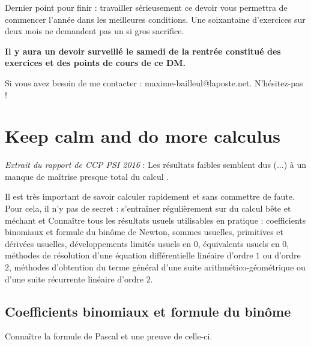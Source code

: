 \documentclass[a4paper,twoside,french,10pt]{VcCours}
\begin{document}
\medskip

Dernier point pour finir : travailler sérieusement ce devoir vous permettra de commencer l'année dans les meilleures conditions. Une soixantaine d'exercices sur deux mois ne demandent pas un si gros sacrifice. 

\medskip

\begin{center}
\end{center}

\begin{center}
\textbf{Il y aura un devoir surveillé  le samedi de la rentrée constitué des exercices et des points de cours de ce DM.}
\end{center}

\medskip

Si vous avez besoin de me contacter : maxime-bailleul@laposte.net. N'hésitez-pas !

\section{Keep calm and do more calculus}

\textit{Extrait du rapport de CCP PSI 2016} : \og Les résultats faibles semblent dus ($\ldots$) à un manque de maîtrise presque total du calcul \fg .

\bigskip

Il est très important de savoir calculer rapidement et sans commettre de faute. Pour cela, il n'y pas de secret : s'entraîner régulièrement sur du calcul \og bête et méchant \fg et Connaître tous les résultats usuels utilisables en pratique : coefficients binomiaux et formule du binôme de Newton, sommes usuelles, primitives et dérivées usuelles, développements limités usuels en $0$, équivalents usuels en $0$, méthodes de résolution d'une équation différentielle linéaire d'ordre $1$ ou d'ordre $2$, méthodes d'obtention du terme général d'une suite arithmético-géométrique  ou d'une suite récurrente linéaire d'ordre $2$.

\medskip

\subsection{Coefficients binomiaux et formule du binôme}

\begin{ptc}{}
	Connaître la formule de Pascal et une preuve de celle-ci.
\end{ptc}
\end{document}
